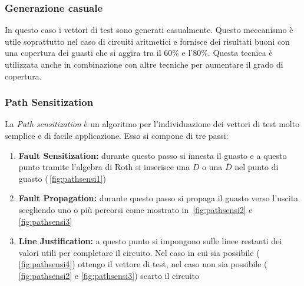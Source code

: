 \subsubsection{Generazione casuale}
In questo caso i vettori di test sono generati casualmente. Questo meccanismo è utile soprattutto nel caso di circuiti aritmetici e fornisce dei risultati buoni con una copertura dei guasti che si aggira tra il 60\% e l'80\%. Questa tecnica è utilizzata anche in combinazione con altre tecniche per aumentare il grado di copertura.
\subsubsection{Path Sensitization}
La \emph{Path sensitization} è un algoritmo per l'individuazione dei vettori di test molto semplice e di facile applicazione. Esso si compone di tre passi:
\begin{enumerate}
\item \textbf{Fault Sensitization:} durante questo passo si innesta il guasto e a questo punto tramite l'algebra di Roth si inserisce una $D$ o una $\overline{D}$ nel punto di guasto (\figurename\,\ref{fig:pathsensi1})
\item \textbf{Fault Propagation:} durante questo passo si propaga il guasto verso l'uscita scegliendo uno o più percorsi come mostrato in \figurename\,\ref{fig:pathsensi2} e \figurename\,\ref{fig:pathsensi3}
\item \textbf{Line Justification:} a questo punto si impongono sulle linee restanti dei valori utili per completare il circuito. Nel caso in cui sia possibile (\figurename\,\ref{fig:pathsensi4}) ottengo il vettore di test, nel caso non sia possibile (\figurename\,\ref{fig:pathsensi2} e \ref{fig:pathsensi3}) scarto il circuito
\end{enumerate} 
